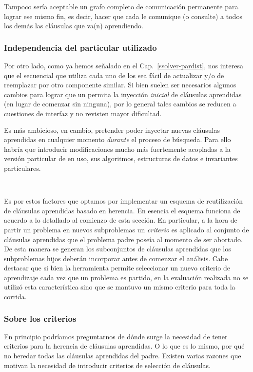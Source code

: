 Tampoco sería aceptable un grafo completo de comunicación permanente para
lograr ese mismo fin, es decir, hacer que cada \w le comunique (o consulte) a
todos los demás las cláusulas que va(n) aprendiendo.


\subsubsection{Independencia del \ssolver particular utilizado}

Por otro lado, como ya hemos señalado en el Cap.~\ref{ssolver-pardist}, nos
interesa que el \ssolver secuencial que utiliza cada uno de los \ws sea fácil
de actualizar y/o de reemplazar por otro componente \ots similar. Si bien
suelen ser necesarios algunos cambios para lograr que un \ssolver permita la
inyección \emph{inicial} de cláusulas aprendidas (en lugar de comenzar sin
ninguna), por lo general tales cambios se reducen a cuestiones de interfaz y
no revisten mayor dificultad.

Es más ambicioso, en cambio, pretender poder inyectar nuevas cláusulas
aprendidas en cualquier momento \emph{durante} el proceso de búsqueda. Para
ello habría que introducir modificaciones mucho más fuertemente acopladas a la
versión particular de \ssolver en uso, sus algoritmos, estructuras de datos e
invariantes particulares.

\

Es por estos factores que optamos por implementar un esquema de reutilización
de cláusulas aprendidas basado en herencia. En esencia el esquema funciona de
acuerdo a lo detallado al comienzo de esta sección. En particular, a la hora
de partir un problema en nuevos subproblemas un \emph{criterio} es aplicado al
conjunto de cláusulas aprendidas que el problema padre poseía al momento de
ser abortado. De esta manera se generan los subconjuntos de cláusulas
aprendidas que los subproblemas hijos deberán incorporar antes de comenzar el
análisis. Cabe destacar que si bien la herramienta permite seleccionar un
nuevo criterio de aprendizaje cada vez que un problema es partido, en la
evaluación realizada no se utilizó esta característica sino que se mantuvo un
mismo criterio para toda la corrida.


\subsubsection{Sobre los criterios}

En principio podríamos preguntarnos de dónde surge la necesidad de tener
criterios para la herencia de cláusulas aprendidas. O lo que es lo mismo, por
qué no heredar todas las cláusulas aprendidas del padre. Existen varias
razones que motivan la necesidad de introducir criterios de selección de
cláusulas.

